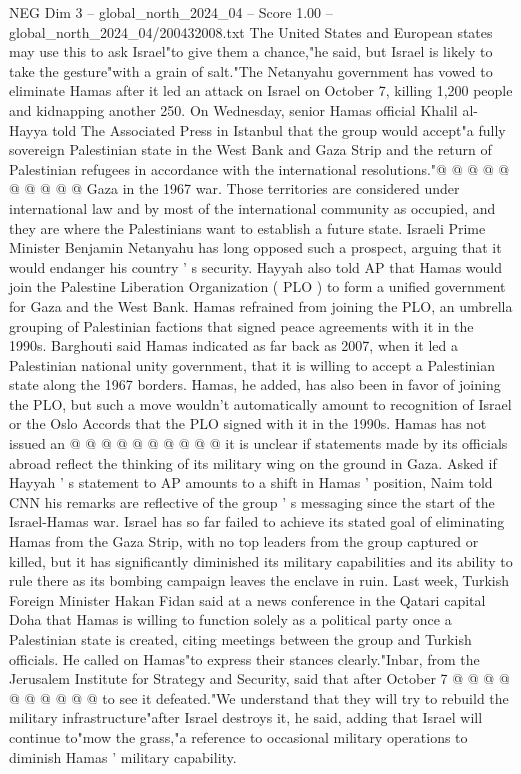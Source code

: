\begin{textsample}{NEG Dim 3 – global\_north\_2024\_04 – Score 1.00 – global\_north\_2024\_04/200432008.txt}
The United States and European states may use this to ask Israel"to give them a chance,"he said, but Israel is likely to take the gesture"with a grain of salt."The Netanyahu government has vowed to eliminate Hamas after it led an attack on Israel on October 7, killing 1,200 people and kidnapping another 250.
On Wednesday, senior Hamas official Khalil al-Hayya told The Associated Press in Istanbul that the group would accept"a fully sovereign Palestinian state in the West Bank and Gaza Strip and the return of Palestinian refugees in accordance with the international resolutions."@ @ @ @ @ @ @ @ @ @ Gaza in the 1967 war.
Those territories are considered under international law and by most of the international community as occupied, and they are where the Palestinians want to establish a future state.
Israeli Prime Minister Benjamin Netanyahu has long opposed such a prospect, arguing that it would endanger his country ' s security.
Hayyah also told AP that Hamas would join the Palestine Liberation Organization ( PLO ) to form a unified government for Gaza and the West Bank.
Hamas refrained from joining the PLO, an umbrella grouping of Palestinian factions that signed peace agreements with it in the 1990s.
Barghouti said Hamas indicated as far back as 2007, when it led a Palestinian national unity government, that it is willing to accept a Palestinian state along the 1967 borders.
Hamas, he added, has also been in favor of joining the PLO, but such a move wouldn't automatically amount to recognition of Israel or the Oslo Accords that the PLO signed with it in the 1990s.
Hamas has not issued an @ @ @ @ @ @ @ @ @ @ it is unclear if statements made by its officials abroad reflect the thinking of its military wing on the ground in Gaza.
Asked if Hayyah ' s statement to AP amounts to a shift in Hamas ' position, Naim told CNN his remarks are reflective of the group ' s messaging since the start of the Israel-Hamas war.
Israel has so far failed to achieve its stated goal of eliminating Hamas from the Gaza Strip, with no top leaders from the group captured or killed, but it has significantly diminished its military capabilities and its ability to rule there as its bombing campaign leaves the enclave in ruin.
Last week, Turkish Foreign Minister Hakan Fidan said at a news conference in the Qatari capital Doha that Hamas is willing to function solely as a political party once a Palestinian state is created, citing meetings between the group and Turkish officials.
He called on Hamas"to express their stances clearly."Inbar, from the Jerusalem Institute for Strategy and Security, said that after October 7 @ @ @ @ @ @ @ @ @ @ to see it defeated."We understand that they will try to rebuild the military infrastructure"after Israel destroys it, he said, adding that Israel will continue to"mow the grass,"a reference to occasional military operations to diminish Hamas ' military capability.

\end{textsample}
